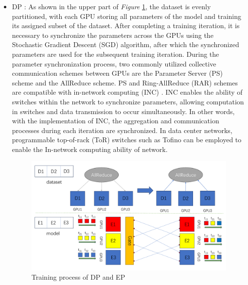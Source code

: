 \documentclass[conference]{IEEEtran}
\begin{document}
\begin{itemize}
	
	\item DP \cite{Parallelism}: As shown in the upper part of \emph{Figure} \ref{fig:picture4}, the dataset is evenly partitioned, with each GPU storing all parameters of the model and training its assigned subset of the dataset. After completing a training iteration, it is necessary to synchronize the parameters across the GPUs using the Stochastic Gradient Descent (SGD)  \cite{SGD2010} algorithm, after which the synchronized parameters are used for the subsequent training iteration. During the parameter synchronization process, two commonly utilized collective communication schemes between GPUs are the Parameter Server (PS) \cite{PS} scheme and the AllReduce scheme. PS and Ring-AllReduce (RAR) schemes are compatible with in-network computing (INC) \cite{INC2019, Rina}. INC enables the ability of switches within the network to synchronize parameters, allowing computation in switches and data transmission to occur simultaneously. In other words, with the implementation of INC, the aggregation and communication processes during each iteration are synchronized.	In data center networks, programmable top-of-rack (ToR) switches such as Tofino can be employed to enable the In-network computing ability of network.
	
	\begin{figure}
		\centering
		\includegraphics[width=1\linewidth]{figure/picture4}
		\caption{Training process of DP and EP}
		\label{fig:picture4}
	\end{figure}
	

\end{itemize}
\end{document}

